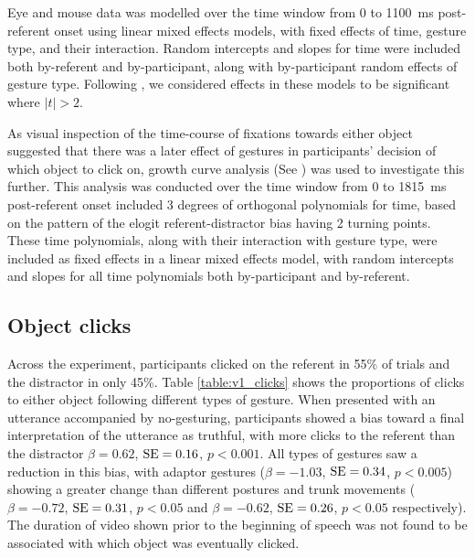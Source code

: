 \documentclass[a4paper,man,natbib]{apa6}
\newcommand{\resultsLog}[3]{$\beta = #1$, $\textnormal{SE} = #2$, $p #3$}
\begin{document}
Eye and mouse data was modelled over the time window from 0 to 1100~ms post-referent onset using linear mixed effects models, with fixed effects of time, gesture type, and their interaction.
Random intercepts and slopes for time were included both by-referent and by-participant, along with by-participant random effects of gesture type.
Following \citet{Baayen2008}, we considered effects in these models to be significant where $|t|>2$.

As visual inspection of the time-course of fixations towards either object suggested that there was a later effect of gestures in participants' decision of which object to click on, growth curve analysis (See \citealt{Mirman2008}) was used to investigate this further. 
This analysis was conducted over the time window from 0 to 1815~ms post-referent onset included 3 degrees of orthogonal polynomials for time, based on the pattern of the elogit referent-distractor bias having 2 turning points. 
These time polynomials, along with their interaction with gesture type, were included as fixed effects in a linear mixed effects model, with random intercepts and slopes for all time polynomials both by-participant and by-referent.


\subsection{Object clicks} %
Across the experiment, participants clicked on the referent in 55\% of trials and the distractor in only 45\%.
Table \ref{table:v1_clicks} shows the proportions of clicks to either object following different types of gesture.
When presented with an utterance accompanied by no-gesturing, participants showed a bias toward a final interpretation of the utterance as truthful, with more clicks to the referent than the distractor \resultsLog{0.62}{0.16}{<0.001}.
All types of gestures saw a reduction in this bias, with adaptor gestures (\resultsLog{-1.03}{0.34}{<0.005}) showing a greater change than different postures and trunk movements (\resultsLog{-0.72}{0.31}{<0.05} and \resultsLog{-0.62}{0.26}{<0.05} respectively). 
The duration of video shown prior to the beginning of speech was not found to be associated with which object was eventually clicked.
\end{document}
